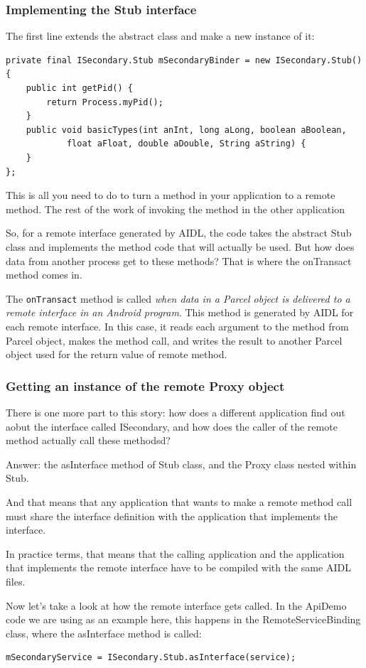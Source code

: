 \documentclass[11pt, a4paper]{book}
\begin{document}
\subsubsection{Implementing the Stub interface}
The first line extends the abstract class and make a new instance of it:
\begin{verbatim}
private final ISecondary.Stub mSecondaryBinder = new ISecondary.Stub() {
    public int getPid() {
        return Process.myPid();
    }
    public void basicTypes(int anInt, long aLong, boolean aBoolean,
            float aFloat, double aDouble, String aString) {
    }
};
\end{verbatim}
This is all you need to do to turn a method in your application to a remote
method. The rest of the work of invoking the method in the other application

So, for a remote interface generated by AIDL, the code takes the abstract Stub class and implements the method code that will actually be used. But how does data from another process get to these methods? That is where the onTransact method comes in.

The \verb|onTransact| method is called \emph{when data in a Parcel object is
delivered to a remote interface in an Android program}. This method is generated
by AIDL for each remote interface. In this case, it reads each argument to the
method from Parcel object, makes the method call, and writes the result to
another Parcel object used for the return value of remote method.
\subsubsection{Getting an instance of the remote Proxy object}
There is one more part to this story: how does a different application find out
aobut the interface called ISecondary, and how does the caller of the remote
method actually call these methodsd? 

Answer: the asInterface method of Stub class, and the Proxy class nested within
Stub.

And that means that any application that wants to make a remote method call must
share the interface definition with the application that implements the
interface.

In practice terms, that means that the calling application and the application
that implements the remote interface have to be compiled with the same AIDL
files.

Now let's take a look at how the remote interface gets called. In the ApiDemo
code we are using as an example here, this happens in the RemoteServiceBinding
class, where the asInterface method is called:
\begin{verbatim}
mSecondaryService = ISecondary.Stub.asInterface(service);
\end{verbatim}
\end{document}
